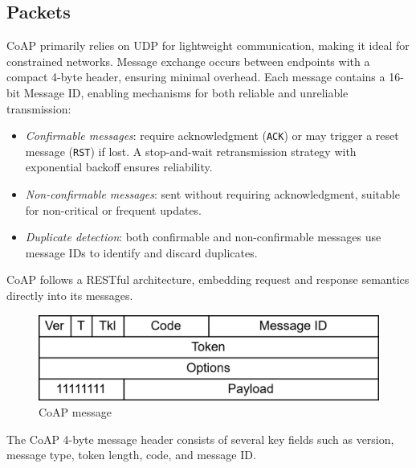 \subsection{Packets}
CoAP primarily relies on UDP for lightweight communication, making it ideal for constrained networks. 
Message exchange occurs between endpoints with a compact 4-byte header, ensuring minimal overhead.
Each message contains a 16-bit Message ID, enabling mechanisms for both reliable and unreliable transmission:
\begin{itemize}
    \item \textit{Confirmable messages}: require acknowledgment (\texttt{ACK}) or may trigger a reset message (\texttt{RST}) if lost. 
        A stop-and-wait retransmission strategy with exponential backoff ensures reliability.
    \item \textit{Non-confirmable messages}: sent without requiring acknowledgment, suitable for non-critical or frequent updates.
    \item \textit{Duplicate detection}: both confirmable and non-confirmable messages use message IDs to identify and discard duplicates.
\end{itemize}
\noindent CoAP follows a RESTful architecture, embedding request and response semantics directly into its messages. 
\begin{figure}[H]
    \centering
    \includegraphics[width=0.5\linewidth]{images/iot10.png}
    \caption{CoAP message}
\end{figure}
\noindent The CoAP 4-byte message header consists of several key fields such as version, message type, token length, code, and message ID. 

